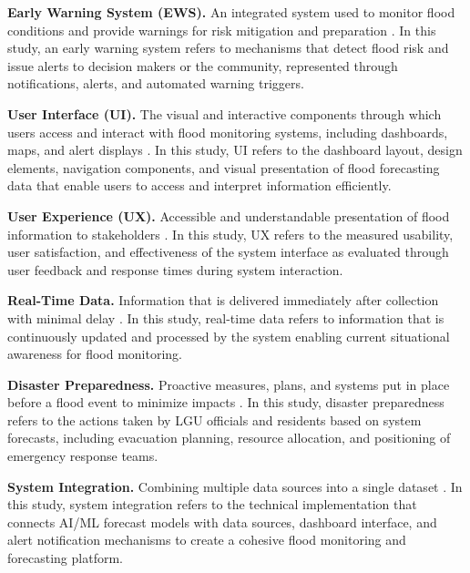 \documentclass{research}
\begin{document}
\textbf{Early Warning System (EWS).} An integrated system used to monitor flood conditions and provide warnings for risk mitigation and preparation \cite{hammood2021systematic}. In this study, an early warning system refers to mechanisms that detect flood risk and issue alerts to decision makers or the community, represented through notifications, alerts, and automated warning triggers.

\textbf{User Interface (UI).} The visual and interactive components through which users access and interact with flood monitoring systems, including dashboards, maps, and alert displays \cite{te2024smart}. In this study, UI refers to the dashboard layout, design elements, navigation components, and visual presentation of flood forecasting data that enable users to access and interpret information efficiently.

\textbf{User Experience (UX).} Accessible and understandable presentation of flood information to stakeholders \cite{tolentino2022real}. In this study, UX refers to the measured usability, user satisfaction, and effectiveness of the system interface as evaluated through user feedback and response times during system interaction.

\textbf{Real-Time Data.} Information that is delivered immediately after collection with minimal delay \cite{te2024smart}. In this study, real-time data refers to information that is continuously updated and processed by the system enabling current situational awareness for flood monitoring.

\textbf{Disaster Preparedness.} Proactive measures, plans, and systems put in place before a flood event to minimize impacts \cite{aldhafiri2025leveraging,hammood2021systematic}. In this study, disaster preparedness refers to the actions taken by LGU officials and residents based on system forecasts, including evacuation planning, resource allocation, and positioning of emergency response teams.

\textbf{System Integration.} Combining multiple data sources into a single dataset \cite{koutsovili2023early}. In this study, system integration refers to the technical implementation that connects AI/ML forecast models with data sources, dashboard interface, and alert notification mechanisms to create a cohesive flood monitoring and forecasting platform.

\clearpage

\end{document}
